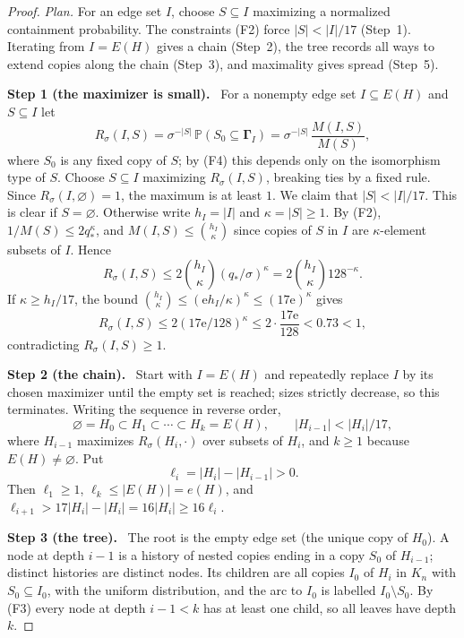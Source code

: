 \documentclass[11pt]{article}
\numberwithin{equation}{section}
\newcommand{\PP}{\mathbb P}
\newcommand{\ee}{\mathrm e}
\newcommand{\GG}{\boldsymbol\Gamma}
\newcommand{\qs}{q_*}
\newcommand{\step}[2]{\par\medskip\noindent\textbf{Step #1 (#2).}\ }
\begin{document}
\begin{proof}
\emph{Plan.} For an edge set $I$, choose $S\subseteq I$ maximizing a
normalized containment probability. The constraints (F2) force
$|S|<|I|/17$ (Step~1). Iterating from $I=E(H)$ gives a chain
(Step~2), the tree records all ways to extend copies along the chain
(Step~3), and maximality gives spread (Step~5).

\step{1}{the maximizer is small}
For a nonempty edge set $I\subseteq E(H)$ and $S\subseteq I$ let
\begin{equation}\label{eq:maximizer}
 R_\sigma(I,S)=\sigma^{-|S|}\,\PP(S_0\subseteq\GG_I)
 =\sigma^{-|S|}\,\frac{M(I,S)}{M(S)},
\end{equation}
where $S_0$ is any fixed copy of $S$; by (F4) this depends only on the
isomorphism type of $S$. Choose $S\subseteq I$ maximizing
$R_\sigma(I,S)$, breaking ties by a fixed rule. Since
$R_\sigma(I,\varnothing)=1$, the maximum is at least $1$. We claim that
$|S|<|I|/17$. This is clear if $S=\varnothing$. Otherwise write
$h_I=|I|$ and $\kappa=|S|\ge1$. By (F2), $1/M(S)\le2\qs^\kappa$, and
$M(I,S)\le\binom{h_I}{\kappa}$ since copies of $S$ in $I$ are
$\kappa$-element subsets of $I$. Hence
\[
 R_\sigma(I,S)\le2\binom{h_I}{\kappa}(\qs/\sigma)^\kappa
           =2\binom{h_I}{\kappa}128^{-\kappa}.
\]
If $\kappa\ge h_I/17$, the bound
$\binom{h_I}{\kappa}\le(\ee h_I/\kappa)^\kappa\le(17\ee)^\kappa$ gives
\[
 R_\sigma(I,S)\le2(17\ee/128)^\kappa\le2\cdot\frac{17\ee}{128}<0.73<1,
\]
contradicting $R_\sigma(I,S)\ge1$.

\step{2}{the chain}
Start with $I=E(H)$ and repeatedly replace $I$ by its chosen maximizer
until the empty set is reached; sizes strictly decrease, so this
terminates. Writing the sequence in reverse order,
\[
 \varnothing=H_0\subset H_1\subset\cdots\subset H_k=E(H),
 \qquad |H_{i-1}|<|H_i|/17,
\]
where $H_{i-1}$ maximizes $R_\sigma(H_i,\cdot)$ over subsets of $H_i$,
and $k\ge1$ because $E(H)\ne\varnothing$. Put
\[
 \ell_i=|H_i|-|H_{i-1}|>0 .
\]
Then $\ell_1\ge1$, $\ell_k\le|E(H)|=e(H)$, and
$\ell_{i+1}>17|H_i|-|H_i|=16|H_i|\ge16\ell_i$.

\step{3}{the tree}
The root is the empty edge set (the unique copy of $H_0$). A node at
depth $i-1$ is a history of nested copies ending in a copy $S_0$ of
$H_{i-1}$; distinct histories are distinct nodes. Its children are all
copies $I_0$ of $H_i$ in $K_n$ with $S_0\subseteq I_0$, with the uniform
distribution, and the arc to $I_0$ is labelled $I_0\setminus S_0$. By
(F3) every node at depth $i-1<k$ has at least one child, so all leaves
have depth $k$.


\end{proof}
\end{document}
